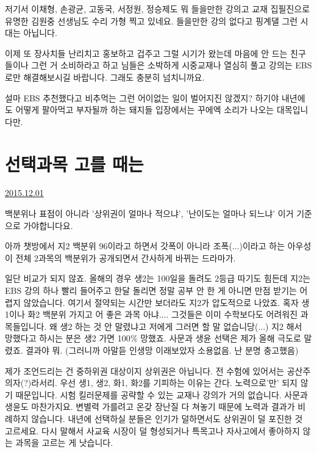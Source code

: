 저기서 이채형, 손광균, 고동국, 서정원, 정승제도 뭐 들을만한 강의고
교재 집필진으로 유명한 김원중 선생님도 수리 가형 찍고 있네요.
들을만한 강의 없다고 핑계댈 그런 시대는 아닙니다.
\vspace{5mm}

이제 또 장사치들 난리치고 홍보하고 겁주고 그럴 시기가 왔는데
마음에 안 드는 친구들이나 그런 거 소비하라고 하고
님들은 소박하게 시중교재나 열심히 풀고 강의는 EBS로만 해결해보시길 바랍니다.
그래도 충분히 넘치니까요.
\vspace{5mm}

설마 EBS 추천했다고 비추먹는 그런 어이없는 일이 벌어지진 않겠지?
하기야 내년에도 어떻게 팔아먹고 부자될까 하는 돼지들 입장에서는 꾸에엑 소리가 나오는 대목입니다만.
\vspace{5mm}






\section{선택과목 고를 때는}
\href{https://www.kockoc.com/Apoc/521445}{2015.12.01}

\vspace{5mm}

백분위나 표점이 아니라
'상위권이 얼마나 적으냐', '난이도는 얼마나 되느냐'
이거 기준으로 가야합니다요.
\vspace{5mm}

아까 챗방에서 지2 백분위 96이라고 하면서 갓폭이 아니라 조폭(...)이라고 하는 아우성이
전체 2과목의 백분위가 공개되면서 간사하게 바뀌는 드라마가.
\vspace{5mm}

일단 비교가 되지 않죠.
올해의 경우 생2는 100일을 돌려도 2등급 따기도 힘든데
지2는 EBS 강의 하나 빨리 들어주고 한달 돌리면 정말 공부 안 한 게 아니면 만점 받기는 어렵지 않았습니다.
여기서 절약되는 시간만 보더라도 지2가 압도적으로 나았죠.
혹자 생1이나 화2 백분위 가지고 어 좋은 과목 아냐.... 그것들은 이미 수학보다도 어려워진 과목들입니다.
왜 생2 하는 것 안 말렸냐고 저에게 그러면 할 말 없습니당(...)
지2 해서 망했다고 하시는 분은 생2 가면 100$\%$ 망했죠.
사문과 생윤 선택은 제가 올해 극도로 말렸죠. 결과야 뭐.
(그러니까 아말듣 인생망 이래보았자 소용없음. 난 분명 충고했음)
\vspace{5mm}

제가 조언드리는 건 중하위권 대상이지 상위권은 아닙니다. 전 수험에 있어서는 공산주의자(?)라서리.
우선 생1, 생2, 화1, 화2를 기피하는 이유는 간다. 노력으로'만' 되지 않기 때문입니다.
시험 킬러문제를 공략할 수 있는 교재나 강의가 거의 없습니다.
사문과 생윤도 마찬가지요. 변별력 가를려고 온갖 장난질 다 쳐놓기 때문에 노력과 결과가 비례하지 않습니다.
내년에 선택하실 분들은 인기가 덜하면서도 상위권이 덜 포진한 것 고르세요.
다시 말해서 사교육 시장이 덜 형성되거나 특목고나 자사고에서 좋아하지 않는 과목을 고르는 게 낫습니다.
\vspace{5mm}

